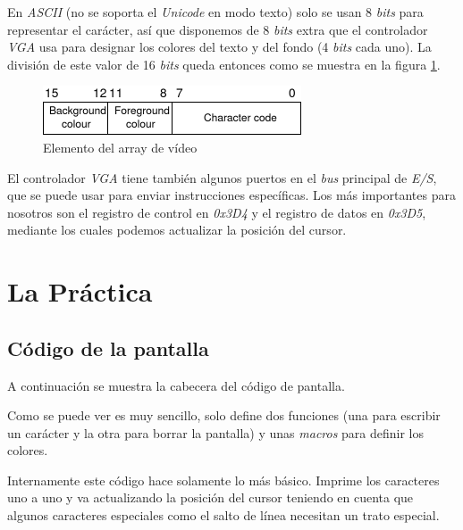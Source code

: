 \documentclass{report}
\begin{document}
En \textit{ASCII} (no se soporta el \textit{Unicode} en modo texto) solo se usan 8 \textit{bits} para representar el carácter,
así que disponemos de 8 \textit{bits} extra que el controlador \textit{VGA} usa para designar los colores del texto y del fondo (4 \textit{bits} cada uno).
La división de este valor de 16 \textit{bits} queda entonces como se muestra en la figura \ref{fig:vga_word}.

\begin{figure}[htb]
\centering
\includegraphics[scale=0.7]{word_format.png}
\caption{Elemento del array de vídeo}
\label{fig:vga_word}
\end{figure}

El controlador \textit{VGA} tiene también algunos puertos en el \textit{bus} principal de \textit{E/S}, que se puede usar para enviar instrucciones específicas.
Los más importantes para nosotros son el registro de control en \textit{0x3D4} y el registro de datos en \textit{0x3D5},
mediante los cuales podemos actualizar la posición del cursor.

\section{La Práctica}
\subsection{Código de la pantalla}

A continuación se muestra la cabecera del código de pantalla.



Como se puede ver es muy sencillo, solo define dos funciones (una para escribir un carácter y la otra para borrar la pantalla) y unas \textit{macros} para definir los colores.

Internamente este código hace solamente lo más básico.
Imprime los caracteres uno a uno y va actualizando la posición del cursor teniendo en cuenta que algunos caracteres especiales como el salto de línea necesitan un trato especial.
\end{document}
